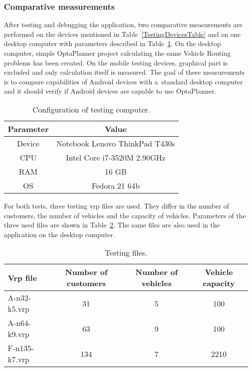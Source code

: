 \subsubsection{Comparative measurements}
After testing and debugging the application, two comparative measurements are performed on the devices mentioned in
Table~\ref{TestingDevicesTable} and on one desktop computer with parameters described in
Table~\ref{TestingComputerTable}. On the desktop computer, simple OptaPlanner project calculating the same Vehicle
Routing problems has been created. On the mobile testing devices, graphical part is excluded and only calculation itself
is measured. The goal of these measurements is to compare capabilities of Android devices with a~standard desktop
computer and it should verify if Android devices are capable to use OptaPlanner.
\\
\begin{table}[h!]
    \begin{tabular}{|c|c|}
        \hline
        \textbf{Parameter} &
        \textbf{Value} \\ \hline \hline
        Device    & Notebook Lenovo ThinkPad T430s \\ \hline
        CPU       & Intel Core i7-3520M 2.90GHz    \\ \hline
        RAM       & 16 GB                          \\ \hline
        OS        & Fedora 21 64b                  \\ \hline
    \end{tabular}
    \centering
    \caption{Configuration of testing computer.}
    \label{TestingComputerTable}
\end{table}

For both tests, three testing vrp files are used. They differ in the number of customers, the number of vehicles and
the capacity of vehicles. Parameters of the three used files are shown in Table~\ref{TestingFilesTable}. The same files
are also used in the application on the desktop computer.
\\
\begin{table}[h!]
    \begin{tabular}{|l|c|c|c|}
        \hline
        \textbf{Vrp file} &
        \textbf{Number of customers} &
        \textbf{Number of vehicles} &
        \textbf{Vehicle capacity} \\ \hline \hline
        A-n32-k5.vrp   & 31   & 5 & 100  \\ \hline
        A-n64-k9.vrp   & 63   & 9 & 100  \\ \hline
        F-n135-k7.vrp  & 134  & 7 & 2210 \\ \hline
    \end{tabular}
    \centering
    \caption{Testing files.}
    \label{TestingFilesTable}
\end{table}

